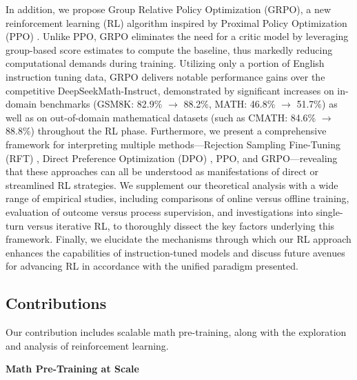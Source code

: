 In addition, we propose Group Relative Policy Optimization (GRPO), a new reinforcement learning (RL) algorithm inspired by Proximal Policy Optimization (PPO) \citep{schulman2017proximal}. Unlike PPO, GRPO eliminates the need for a critic model by leveraging group-based score estimates to compute the baseline, thus markedly reducing computational demands during training. Utilizing only a portion of English instruction tuning data, GRPO delivers notable performance gains over the competitive DeepSeekMath-Instruct, demonstrated by significant increases on in-domain benchmarks (GSM8K: 82.9\% $\rightarrow$ 88.2\%, MATH: 46.8\% $\rightarrow$ 51.7\%) as well as on out-of-domain mathematical datasets (such as CMATH: 84.6\% $\rightarrow$ 88.8\%) throughout the RL phase. Furthermore, we present a comprehensive framework for interpreting multiple methods—Rejection Sampling Fine-Tuning (RFT) \citep{yuan2023scaling}, Direct Preference Optimization (DPO) \citep{dpo}, PPO, and GRPO—revealing that these approaches can all be understood as manifestations of direct or streamlined RL strategies. We supplement our theoretical analysis with a wide range of empirical studies, including comparisons of online versus offline training, evaluation of outcome versus process supervision, and investigations into single-turn versus iterative RL, to thoroughly dissect the key factors underlying this framework. Finally, we elucidate the mechanisms through which our RL approach enhances the capabilities of instruction-tuned models and discuss future avenues for advancing RL in accordance with the unified paradigm presented.

\subsection{Contributions}
Our contribution includes scalable math pre-training, along with the exploration and analysis of reinforcement learning.

\textbf{Math Pre-Training at Scale}


